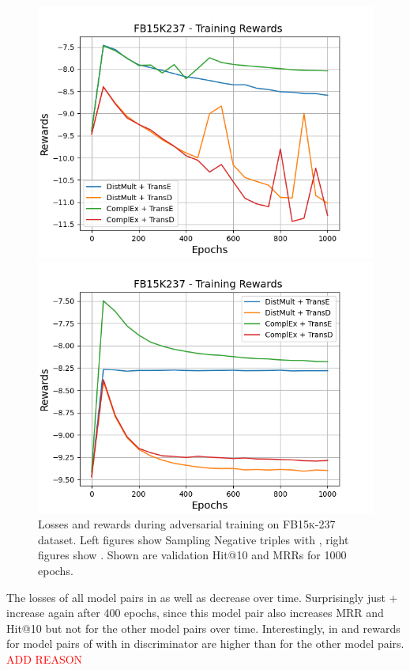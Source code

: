 \begin{figure}
    \begin{minipage}{.5\textwidth}
      \centering
      \includegraphics[width=0.9\linewidth]{figures/results/gan_train/not_pretrained/uncertainty/max/entropy/fb15k237/uncertainty_fb15k237_rew.png}
    \end{minipage}%
    \begin{minipage}{.5\textwidth}
      \centering
      \includegraphics[width=0.9\linewidth]{figures/results/gan_train/not_pretrained/uncertainty/max_distribution/entropy/fb15k237/uncertainty_fb15k237_rew.png}
    \end{minipage}%
    \caption{Losses and rewards during adversarial training on \textsc{FB15k-237} dataset. 
    Left figures show Sampling Negative triples with \usmax, right figures show \ussoftmax.
    Shown are validation Hit@10 and MRRs for 1000 epochs.}
    \label{fig:advtrain_fb15k237_usmax_ussoftmax_losses_rewards}
\end{figure}
The losses of all model pairs in \usmax as well as \ussoftmax decrease over time.
Surprisingly just \complex + \transe increase again after 400 epochs, since this model pair also increases MRR and Hit@10 but not for the other model pairs over time.
Interestingly, in \usmax and \ussoftmax rewards for model pairs of with \transe in discriminator are higher than for the other model pairs.
\textcolor{red}{ADD REASON}
